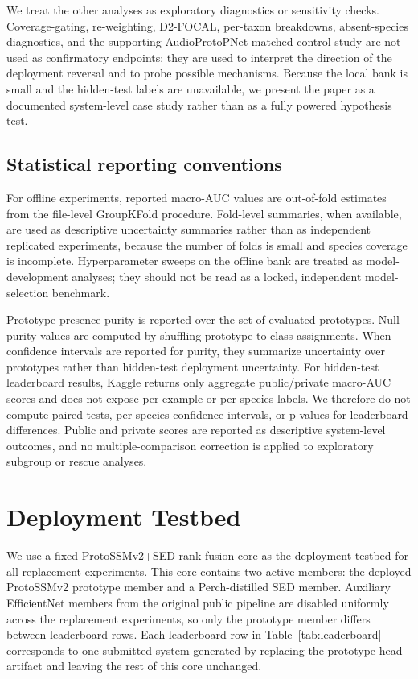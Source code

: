 \documentclass{ceurart}
\begin{document}
We treat the other analyses as exploratory diagnostics or sensitivity checks. Coverage-gating, re-weighting, D2-FOCAL, per-taxon breakdowns, absent-species diagnostics, and the supporting AudioProtoPNet matched-control study are not used as confirmatory endpoints; they are used to interpret the direction of the deployment reversal and to probe possible mechanisms. Because the local bank is small and the hidden-test labels are unavailable, we present the paper as a documented system-level case study rather than as a fully powered hypothesis test.

\subsection{Statistical reporting conventions}
\label{sec:statreporting}

For offline experiments, reported macro-AUC values are out-of-fold estimates from the file-level GroupKFold procedure. Fold-level summaries, when available, are used as descriptive uncertainty summaries rather than as independent replicated experiments, because the number of folds is small and species coverage is incomplete. Hyperparameter sweeps on the offline bank are treated as model-development analyses; they should not be read as a locked, independent model-selection benchmark.

Prototype presence-purity is reported over the set of evaluated prototypes. Null purity values are computed by shuffling prototype-to-class assignments. When confidence intervals are reported for purity, they summarize uncertainty over prototypes rather than hidden-test deployment uncertainty. For hidden-test leaderboard results, Kaggle returns only aggregate public/private macro-AUC scores and does not expose per-example or per-species labels. We therefore do not compute paired tests, per-species confidence intervals, or p-values for leaderboard differences. Public and private scores are reported as descriptive system-level outcomes, and no multiple-comparison correction is applied to exploratory subgroup or rescue analyses.


\section{Deployment Testbed}
\label{sec:system}

We use a fixed ProtoSSMv2+SED rank-fusion core as the deployment testbed for all replacement experiments. This core contains two active members: the deployed ProtoSSMv2 prototype member and a Perch-distilled SED member. Auxiliary EfficientNet members from the original public pipeline are disabled uniformly across the replacement experiments, so only the prototype member differs between leaderboard rows. Each leaderboard row in Table~\ref{tab:leaderboard} corresponds to one submitted system generated by replacing the prototype-head artifact and leaving the rest of this core unchanged.
\end{document}
